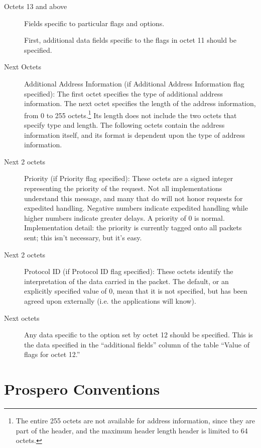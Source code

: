 \begin{description}
\item[Octets 13 and above] Fields specific to particular flags and options.

First, additional data fields  specific to the flags in octet 11
should be specified. 

\item[Next Octets] Additional Address Information (if Additional
Address Information flag specified):  The first octet specifies the
type of additional address information.  The next octet specifies the
length of the address information, from 0 to 255 octets.\footnote{The
entire 255 octets are not available for address information, since they
are part of the header, and the maximum header length header is
limited to 64 octets.}
  Its length
does not include the two octets that specify type and length.   The following
octets contain the address information itself, and its format is
dependent upon the type of address information.  

\item[Next 2 octets] Priority (if Priority flag specified):
These octets are a signed integer representing the priority of the
request.  Not all implementations understand this message, and many
that do will not honor requests for expedited handling.  Negative
numbers indicate expedited handling while higher numbers indicate
greater delays.  A priority of 0 is normal.  Implementation detail:
the priority is currently tagged onto all packets sent; this isn't
necessary, but it's easy.

\item[Next 2 octets] Protocol ID (if Protocol ID flag specified):
These octets identify the interpretation of the data carried in the
packet.  The default, or an explicitly specified value of 0,  mean
that it is not specified, but has been agreed upon externally (i.e.
the applications will know). 

\item[Next octets] Any data specific to the option set by octet 12
should be specified.  This is the data specified in the ``additional
fields'' column of the table ``Value of flags for octet 12.''

\end{description}

\chapter{Prospero Conventions\label{conventions}}

